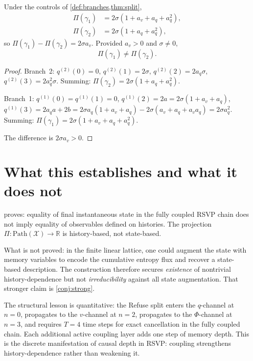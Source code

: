 \documentclass[12pt, oneside]{memoir}
\newcommand{\X}{\mathcal{X}}
\newcommand{\aq}{a_q}
\newcommand{\av}{a_v}
\begin{document}
\begin{theorem}
\label{thm:obs}
Under the controls of \cref{def:branches,thm:split},
\begin{align*}
  \Pi(\gamma_1) &= 2\sigma(1 + \av + \aq + \aq^2), \\
  \Pi(\gamma_2) &= 2\sigma(1 + \aq + \aq^2),
\end{align*}
so $\Pi(\gamma_1) - \Pi(\gamma_2) = 2\sigma\av$.  Provided $\av > 0$ and $\sigma \ne 0$,
\[
  \Pi(\gamma_1) \ne \Pi(\gamma_2).
\]
\end{theorem}

\begin{proof}
Branch~2: $q^{(2)}(0)=0$, $q^{(2)}(1)=2\sigma$, $q^{(2)}(2)=2\aq\sigma$,
$q^{(2)}(3)=2\aq^2\sigma$.  Summing: $\Pi(\gamma_2) = 2\sigma(1+\aq+\aq^2)$.

Branch~1: $q^{(1)}(0)=q^{(1)}(1)=0$,
$q^{(1)}(2)=2a=2\sigma(1+\av+\aq)$,
$q^{(1)}(3)=2\aq a + 2b = 2\sigma\aq(1+\av+\aq) - 2\sigma(\av+\aq+\av\aq) = 2\sigma\aq^2$.
Summing: $\Pi(\gamma_1) = 2\sigma(1+\av+\aq+\aq^2)$.

The difference is $2\sigma\av > 0$.
\end{proof}

\section{What this establishes and what it does not}

 proves: equality of final instantaneous state in the fully coupled
RSVP chain does not imply equality of observables defined on histories.  The projection
$\Pi: \mathrm{Path}(\X) \to \mathbb{R}$ is history-based, not state-based.

What is not proved: in the finite linear lattice, one could augment the state with memory
variables to encode the cumulative entropy flux and recover a state-based description.
The construction therefore secures \emph{existence} of nontrivial history-dependence but
not \emph{irreducibility} against all state augmentation.  That stronger claim is
\cref{conj:strong}.

The structural lesson is quantitative: the Refuse split enters the $q$-channel at $n=0$,
propagates to the $v$-channel at $n=2$, propagates to the $\Phi$-channel at $n=3$, and
requires $T=4$ time steps for exact cancellation in the fully coupled chain.  Each
additional active coupling layer adds one step of memory depth.  This is the discrete
manifestation of causal depth in RSVP: coupling strengthens history-dependence rather
than weakening it.
\end{document}
